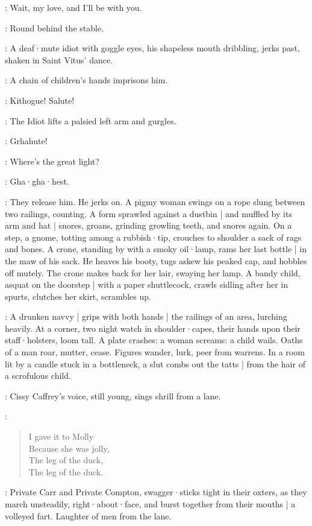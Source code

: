 \Calls:
Wait,
my love,
and I'll be with you.

\Answers:
Round behind the stable.

:
A deaf·mute idiot with goggle eyes,
his shapeless mouth dribbling,
jerks past,
shaken in Saint Vitus' dance.

:
A chain of children's hands imprisons him.

\Children:
Kithogue!
Salute!

:
The Idiot lifts a palsied left arm and gurgles.

\Idiot:
Grhahute!%

\Children:
Where's the great light?

\Idiot:
Gha·gha·hest.

:
They release him.
He jerks on.
A pigmy woman swings on a rope slung between two railings,
counting.
A form sprawled against a dustbin |
and muffled by its arm and hat |
snores,
groans,
grinding growling teeth,
and snores again.
On a step,
a gnome,
totting among a rubbish·tip,
crouches to shoulder a sack of rags and bones.
A crone,
standing by with a smoky oil·lamp,
rams her last bottle |
in the maw of his sack.
He heaves his booty,
tugs askew his peaked cap,
and hobbles off mutely.
The crone makes back for her lair,
swaying her lamp.
A bandy child,
asquat on the doorstep |
with a paper shuttlecock,
crawls sidling after her in spurts,
clutches her skirt,
scrambles up.

:
A drunken navvy |
grips with both hands |
the railings of an area,
lurching heavily.
At a corner,
two night watch in shoulder·capes,
their hands upon their staff·holsters,
loom tall.
A plate crashes:
a woman screams:
a child wails.
Oaths of a man roar,
mutter,
cease.
Figures wander,
lurk,
peer from warrens.
In a room lit by a candle stuck in a bottleneck,
a slut combs out the tatts |
from the hair of a scrofulous child.

:
Cissy Caffrey's voice,
still young,
sings shrill from a lane.

\Cissy:
\begin{verse}
    I gave it to Molly\\
    Because she was jolly,\\
    The leg of the duck,\\
    The leg of the duck.
\end{verse}

:
Private Carr and Private Compton,
swagger·sticks tight in their oxters,
as they march unsteadily,
right·about·face,
and
burst together from their mouths |
a volleyed fart.
Laughter of men from the lane.

